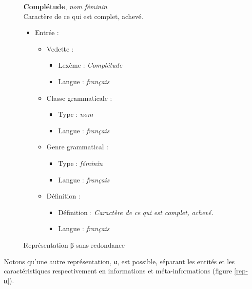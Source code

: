 \documentclass[10pt]{report}
\newcommand{\entité}[1]{\textcolor{blue!60!black}{#1}}
\newcommand{\caractéristique}[1]{\textcolor{green!60!black}{#1}}
\newcommand{\entitétechnique}[1]{\textcolor{blue!50!red}{#1}}
\begin{document}
\begin{figure}[H]
	\centering
	\begin{minipage}{0.3\linewidth}
    \textbf{Complétude}, \textit{nom féminin}\\    
    Caractère de ce qui est complet, achevé.
	\end{minipage}%
	\begin{minipage}{0.5\linewidth}
    \begin{itemize}
    	\item \entité{Entrée} :
    	\begin{itemize}
        \item \entité{Vedette} :
        \begin{itemize}
        	\item \caractéristique{Lexème} : \textit{Complétude}
        	\item \caractéristique{Langue} : \textit{français}
        \end{itemize}
        \item \entité{Classe grammaticale} :
        \begin{itemize}
        	\item \caractéristique{Type} : \textit{nom}
        	\item \caractéristique{Langue} : \textit{français}
        \end{itemize}
        \item \entité{Genre grammatical} :
        \begin{itemize}
        	\item \caractéristique{Type} : \textit{féminin}
        	\item \caractéristique{Langue} : \textit{français}
        \end{itemize}
        \item \entité{Définition} :
        \begin{itemize}
        	\item \caractéristique{Définition} : \textit{Caractère de ce qui est complet, achevé.}
        	\item \caractéristique{Langue} : \textit{français}
        \end{itemize}
    	\end{itemize}
    \end{itemize}
	\end{minipage}
	\caption{Représentation β sans redondance}
	\label{rep-β-non-red}
\end{figure}

Notons qu’une autre représentation, α, est possible, séparant les entités et les caractéristiques respectivement en informations et méta-informations (figure \ref{rep-α}).
\end{document}
